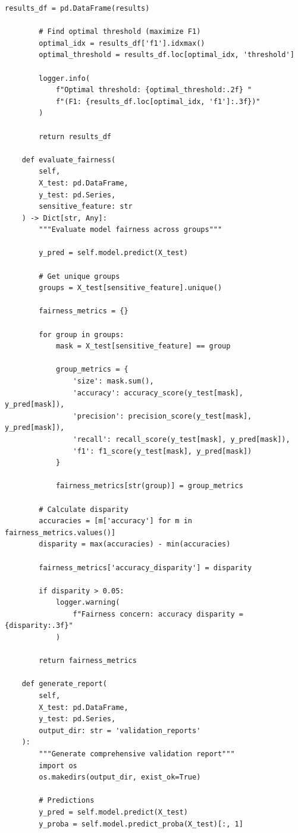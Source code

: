 \begin{lstlisting}[style=python, caption=Production Model Validation Framework]
        results_df = pd.DataFrame(results)

        # Find optimal threshold (maximize F1)
        optimal_idx = results_df['f1'].idxmax()
        optimal_threshold = results_df.loc[optimal_idx, 'threshold']

        logger.info(
            f"Optimal threshold: {optimal_threshold:.2f} "
            f"(F1: {results_df.loc[optimal_idx, 'f1']:.3f})"
        )

        return results_df

    def evaluate_fairness(
        self,
        X_test: pd.DataFrame,
        y_test: pd.Series,
        sensitive_feature: str
    ) -> Dict[str, Any]:
        """Evaluate model fairness across groups"""

        y_pred = self.model.predict(X_test)

        # Get unique groups
        groups = X_test[sensitive_feature].unique()

        fairness_metrics = {}

        for group in groups:
            mask = X_test[sensitive_feature] == group

            group_metrics = {
                'size': mask.sum(),
                'accuracy': accuracy_score(y_test[mask], y_pred[mask]),
                'precision': precision_score(y_test[mask], y_pred[mask]),
                'recall': recall_score(y_test[mask], y_pred[mask]),
                'f1': f1_score(y_test[mask], y_pred[mask])
            }

            fairness_metrics[str(group)] = group_metrics

        # Calculate disparity
        accuracies = [m['accuracy'] for m in fairness_metrics.values()]
        disparity = max(accuracies) - min(accuracies)

        fairness_metrics['accuracy_disparity'] = disparity

        if disparity > 0.05:
            logger.warning(
                f"Fairness concern: accuracy disparity = {disparity:.3f}"
            )

        return fairness_metrics

    def generate_report(
        self,
        X_test: pd.DataFrame,
        y_test: pd.Series,
        output_dir: str = 'validation_reports'
    ):
        """Generate comprehensive validation report"""
        import os
        os.makedirs(output_dir, exist_ok=True)

        # Predictions
        y_pred = self.model.predict(X_test)
        y_proba = self.model.predict_proba(X_test)[:, 1]


\end{lstlisting}
